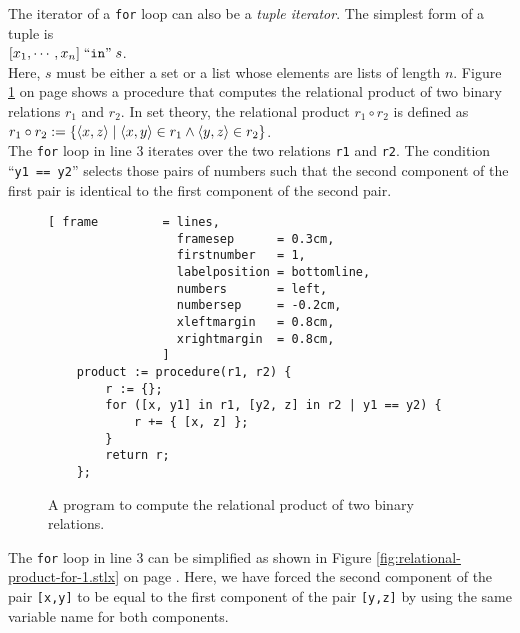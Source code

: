 The iterator of a \texttt{for} loop can also be a \emph{tuple iterator}.  The simplest form of
a tuple is
\\[0.2cm]
\hspace*{1.3cm}
 $[x_1, \cdots, x_n] \;\mbox{``\texttt{in}''}\; s$.
\\[0.2cm]
Here, $s$ must be either a set or a list whose elements are lists of length $n$. 
Figure \ref{fig:relational-product-for.stlx} on page \pageref{fig:relational-product-for.stlx}
shows a procedure that computes the relational product 
of two binary relations $r_1$ and $r_2$.  In set theory, the relational product $r_1 \circ r_2$
is defined as
\\[0.2cm]
\hspace*{1.3cm}
$r_1 \circ r_2 := \{ \pair(x,z) \mid \pair(x,y) \in r_1 \wedge \pair(y,z) \in r_2 \}$.
\\[0.2cm]
The \texttt{for} loop in line 3 iterates over the two relations \texttt{r1} and \texttt{r2}.
The condition ``\texttt{y1 == y2}'' selects those pairs of numbers such that the second
component of the first pair is identical to the first component of the second pair.

\begin{figure}[!ht]
\centering
\begin{Verbatim}[ frame         = lines, 
                  framesep      = 0.3cm, 
                  firstnumber   = 1,
                  labelposition = bottomline,
                  numbers       = left,
                  numbersep     = -0.2cm,
                  xleftmargin   = 0.8cm,
                  xrightmargin  = 0.8cm,
                ]
    product := procedure(r1, r2) {
        r := {};
        for ([x, y1] in r1, [y2, z] in r2 | y1 == y2) {
            r += { [x, z] };
        }
        return r;
    };
\end{Verbatim}
\vspace*{-0.3cm}
\caption{A program to compute the relational product of two binary relations.}
\label{fig:relational-product-for.stlx}
\end{figure}

The \texttt{for} loop in line 3 can be simplified as shown in Figure
\ref{fig:relational-product-for-1.stlx} on page \pageref{fig:relational-product-for-1.stlx}.  Here,
we have forced the second component of the pair \texttt{[x,y]} to be equal to the first component of
the pair \texttt{[y,z]} by using the same variable name for both components.

